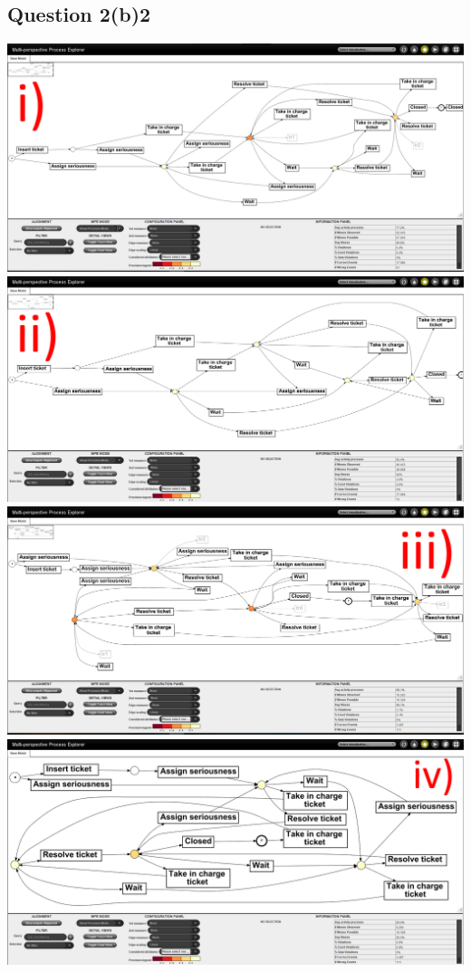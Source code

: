 \documentclass[12pt]{article}
\begin{document}
\subsection*{Question 2(b)2}
\includegraphics[width=\columnwidth]{Question_2/img/ProM_b_region_i_PRE.png}\\
\includegraphics[width=\columnwidth]{Question_2/img/ProM_b_region_ii_PRE.png}\\
\includegraphics[width=\columnwidth]{Question_2/img/ProM_b_region_iii_POST.png}\\
\includegraphics[width=\columnwidth]{Question_2/img/ProM_b_region_iv_POST.png}\\
\end{document}
